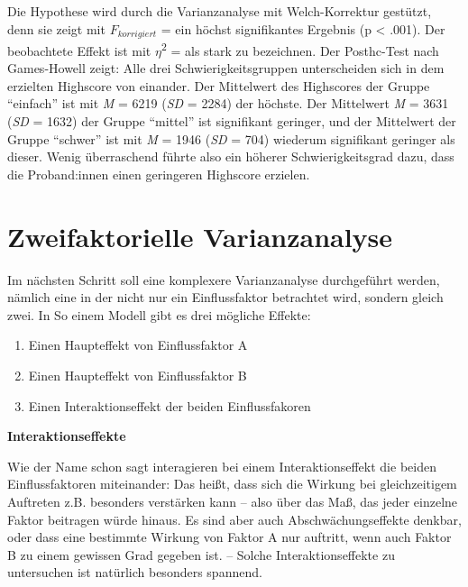 \documentclass[
]{book}
\providecommand{\tightlist}{%
  \setlength{\itemsep}{0pt}\setlength{\parskip}{0pt}}
\begin{document}
Die Hypothese wird durch die Varianzanalyse mit Welch-Korrektur gestützt, denn sie zeigt mit \(F_{korrigiert}\) =  ein höchst signifikantes Ergebnis (p \textless{} .001). Der beobachtete Effekt ist mit \(\eta\)\textsuperscript{2} =  als stark zu bezeichnen. Der Posthc-Test nach Games-Howell zeigt: Alle drei Schwierigkeitsgruppen unterscheiden sich in dem erzielten Highscore von einander. Der Mittelwert des Highscores der Gruppe ``einfach'' ist mit \emph{M} = 6219 (\emph{SD} = 2284) der höchste. Der Mittelwert \emph{M} = 3631 (\emph{SD} = 1632) der Gruppe ``mittel'' ist signifikant geringer, und der Mittelwert der Gruppe ``schwer'' ist mit \emph{M} = 1946 (\emph{SD} = 704) wiederum signifikant geringer als dieser. Wenig überraschend führte also ein höherer Schwierigkeitsgrad dazu, dass die Proband:innen einen geringeren Highscore erzielen.

\hypertarget{zweifaktorielle-varianzanalyse}{%
\chapter{Zweifaktorielle Varianzanalyse}\label{zweifaktorielle-varianzanalyse}}

Im nächsten Schritt soll eine komplexere Varianzanalyse durchgeführt werden, nämlich eine in der nicht nur ein Einflussfaktor betrachtet wird, sondern gleich zwei. In So einem Modell gibt es drei mögliche Effekte:

\begin{enumerate}
\def\labelenumi{\arabic{enumi}.}
\tightlist
\item
  Einen Haupteffekt von Einflussfaktor A
\item
  Einen Haupteffekt von Einflussfaktor B
\item
  Einen Interaktionseffekt der beiden Einflussfakoren
\end{enumerate}

\leavevmode\hypertarget{info_interactionanova}{}%
\textbf{Interaktionseffekte}

Wie der Name schon sagt interagieren bei einem Interaktionseffekt die beiden Einflussfaktoren miteinander: Das heißt, dass sich die Wirkung bei gleichzeitigem Auftreten z.B. besonders verstärken kann -- also über das Maß, das jeder einzelne Faktor beitragen würde hinaus. Es sind aber auch Abschwächungseffekte denkbar, oder dass eine bestimmte Wirkung von Faktor A nur auftritt, wenn auch Faktor B zu einem gewissen Grad gegeben ist. -- Solche Interaktionseffekte zu untersuchen ist natürlich besonders spannend.
\end{document}
